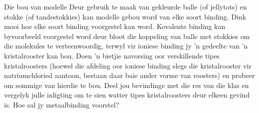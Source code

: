         \label{m38694*id754}
            \begin{activity}{Die bou van modelle}
            \nopagebreak
Deur gebruik te maak van gekleurde balle (of jellytots) en stokke (of tandestokkies) kan modelle gebou word van elke soort binding. Dink mooi hoe elke soort binding voorgestel kan word.  Kovalente binding kan byvoorbeeld voorgestel word deur bloot die koppeling van balle met stokkies om die molekules te verteenwoordig, terwyl vir ioniese binding jy  'n gedeelte van  'n kristalrooster kan bou. Doen  'n  bietjie navorsing oor verskillende tipes kristalroosters (hoewel die afdeling oor ioniese binding slegs die kristalrooster vir natriumchloried aantoon, bestaan daar baie ander vorme van roosters) en probeer om sommige van hierdie te bou. Deel jou bevindinge met die res van die klas en vergelyk julle inligting om te sien watter tipes kristalroosters deur elkeen gevind is. Hoe sal jy metaalbinding voorstel?
\end{activity}

